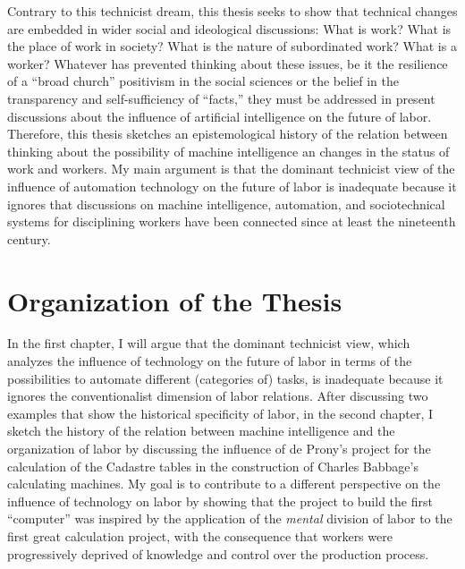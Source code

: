 Contrary to this technicist dream, this thesis seeks to show that technical
changes are embedded in wider social and ideological discussions: What is
work? What is the place of work in society? What is the nature of
subordinated work? What is a worker? Whatever has prevented thinking about
these issues, be it the resilience of a ``broad church'' positivism in the
social sciences or the belief in the transparency and self-sufficiency of
``facts,'' they must be addressed in present discussions about the
influence of artificial intelligence on the future of labor. Therefore,
this thesis sketches an epistemological history of the relation between
thinking about the possibility of machine intelligence an changes in the
status of work and workers. My main argument is that the dominant
technicist view of the influence of automation technology on the future of
labor is inadequate because it ignores that discussions on machine
intelligence, automation, and sociotechnical systems for disciplining
workers have been connected since at least the nineteenth century.

\section{Organization of the Thesis}


In the first chapter, I will argue that the dominant technicist view, which
analyzes the influence of technology on the future of labor in terms of the
possibilities to automate different (categories of) tasks, is inadequate
because it ignores the conventionalist dimension of labor relations. After
discussing two examples that show the historical specificity of labor, in
the second chapter, I sketch the history of the relation between machine
intelligence and the organization of labor by discussing the influence of
de Prony's project for the calculation of the Cadastre tables in the
construction of Charles Babbage's calculating machines. My goal is to
contribute to a different perspective on the influence of technology on
labor by showing that the project to build the first ``computer'' was
inspired by the application of the \textit{mental} division of labor to the
first great calculation project, with the consequence that workers were
progressively deprived of knowledge and control over the production
process.


\mainmatter
\pagestyle{scrheadings}